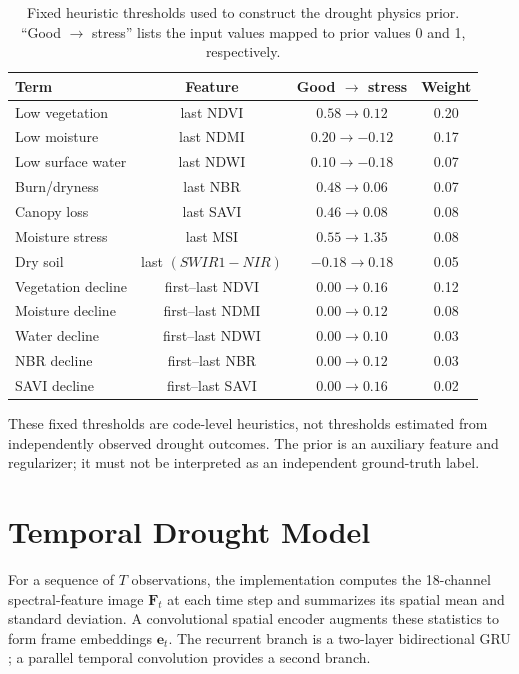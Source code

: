 \documentclass[11pt,a4paper]{article}
\newcommand{\vect}[1]{\bm{#1}}
\begin{document}
\begin{table}[!htbp]
\centering
\caption{Fixed heuristic thresholds used to construct the drought
physics prior. ``Good $\rightarrow$ stress'' lists the input values
mapped to prior values 0 and 1, respectively.}
\label{tab:prior-terms}
\begin{tabular}{lccc}
\toprule
Term & Feature & Good $\rightarrow$ stress & Weight\\
\midrule
Low vegetation & last NDVI & $0.58\rightarrow0.12$ & 0.20\\
Low moisture & last NDMI & $0.20\rightarrow-0.12$ & 0.17\\
Low surface water & last NDWI & $0.10\rightarrow-0.18$ & 0.07\\
Burn/dryness & last NBR & $0.48\rightarrow0.06$ & 0.07\\
Canopy loss & last SAVI & $0.46\rightarrow0.08$ & 0.08\\
Moisture stress & last MSI & $0.55\rightarrow1.35$ & 0.08\\
Dry soil & last $(SWIR1-NIR)$ & $-0.18\rightarrow0.18$ & 0.05\\
Vegetation decline & first--last NDVI & $0.00\rightarrow0.16$ & 0.12\\
Moisture decline & first--last NDMI & $0.00\rightarrow0.12$ & 0.08\\
Water decline & first--last NDWI & $0.00\rightarrow0.10$ & 0.03\\
NBR decline & first--last NBR & $0.00\rightarrow0.12$ & 0.03\\
SAVI decline & first--last SAVI & $0.00\rightarrow0.16$ & 0.02\\
\bottomrule
\end{tabular}
\end{table}

These fixed thresholds are code-level heuristics, not thresholds
estimated from independently observed drought outcomes. The prior is
an auxiliary feature and regularizer; it must not be interpreted as
an independent ground-truth label.


\section{Temporal Drought Model}

For a sequence of $T$ observations, the implementation computes the
18-channel spectral-feature image $\vect F_t$ at each time step and
summarizes its spatial mean and standard deviation. A convolutional
spatial encoder augments these statistics to form frame embeddings
$\vect e_t$. The recurrent branch is a two-layer bidirectional GRU
\cite{cho2014}; a parallel temporal convolution provides a second
branch.
\end{document}
